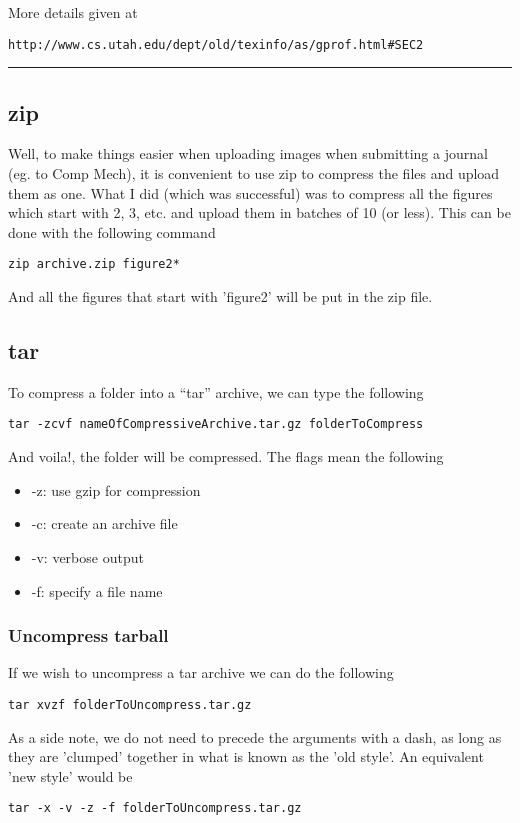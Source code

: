 \documentclass[a4paper, 10pt]{article}
\newcommand{\mybotrule}{\vspace{4mm}\hrule}
\begin{document}
More details given at 
\begin{verbatim}
http://www.cs.utah.edu/dept/old/texinfo/as/gprof.html#SEC2
\end{verbatim}
\mybotrule

\subsection*{zip}

Well, to make things easier when uploading images when submitting a journal (eg. to Comp Mech), it is convenient to use zip to compress the files and upload them as one. What I did (which was successful) was to compress all the figures which start with 2, 3, etc. and upload them in batches of 10 (or less). This can be done with the following command
\begin{verbatim}
zip archive.zip figure2*
\end{verbatim}
And all the figures that start with 'figure2' will be put in the zip file. 

\subsection*{tar}

To compress a folder into a ``tar'' archive, we can type the following
\begin{verbatim}
tar -zcvf nameOfCompressiveArchive.tar.gz folderToCompress
\end{verbatim}
And voila!, the folder will be compressed. The flags mean the following
\begin{itemize}
\item -z: use gzip for compression
\item -c: create an archive file
\item -v: verbose output
\item -f: specify a file name
\end{itemize}

\subsubsection*{Uncompress tarball}
\label{sec:uncompress-tarball}

If we wish to uncompress a tar archive we can do the following
\begin{verbatim}
tar xvzf folderToUncompress.tar.gz
\end{verbatim}
As a side note, we do not need to precede the arguments with a dash,
as long as they are 'clumped' together in what is known as the 'old
style'. An equivalent 'new style' would be
\begin{verbatim}
tar -x -v -z -f folderToUncompress.tar.gz
\end{verbatim}
\end{document}
